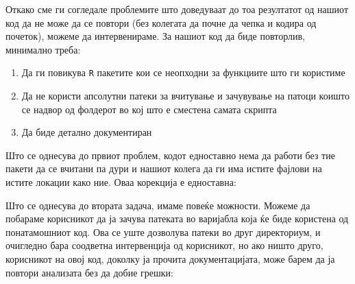 \documentclass[
]{book}
\newenvironment{Shaded}{\begin{snugshade}}{\end{snugshade}}
\newcommand{\CommentTok}[1]{\textcolor[rgb]{0.56,0.35,0.01}{\textit{#1}}}
\newcommand{\DataTypeTok}[1]{\textcolor[rgb]{0.13,0.29,0.53}{#1}}
\newcommand{\KeywordTok}[1]{\textcolor[rgb]{0.13,0.29,0.53}{\textbf{#1}}}
\newcommand{\NormalTok}[1]{#1}
\newcommand{\OperatorTok}[1]{\textcolor[rgb]{0.81,0.36,0.00}{\textbf{#1}}}
\newcommand{\StringTok}[1]{\textcolor[rgb]{0.31,0.60,0.02}{#1}}
\begin{document}
Откако сме ги согледале проблемите што доведуваат до тоа резултатот од нашиот код да не може да се повтори (без колегата да почне да чепка и кодира од почеток), можеме да интервенираме. За нашиот код да биде повторлив, минимално треба:

\begin{enumerate}
\def\labelenumi{\arabic{enumi}.}
\item
  Да ги повикува \texttt{R} пакетите кои се неопходни за функциите што ги користиме
\item
  Да не користи апсолутни патеки за вчитување и зачувување на патоци коишто се надвор од фолдерот во кој што е сместена самата скрипта
\item
  Да биде детално документиран
\end{enumerate}

Што се однесува до првиот проблем, кодот едноставно нема да работи без тие пакети да се вчитани па дури и нашиот колега да ги има истите фајлови на истите локации како ние. Оваа корекција е едноставна:

\begin{Shaded}
\end{Shaded}

Што се однесува до втората задача, имаме повеќе можности. Можеме да побараме корисникот да ја зачува патеката во варијабла која ќе биде користена од понатамошниот код. Ова се уште дозволува патеки во друг директориум, и очигледно бара соодветна интервенција од корисникот, но ако ништо друго, корисникот на овој код, доколку ја прочита документацијата, може барем да ја повтори анализата без да добие грешки:
\end{document}
